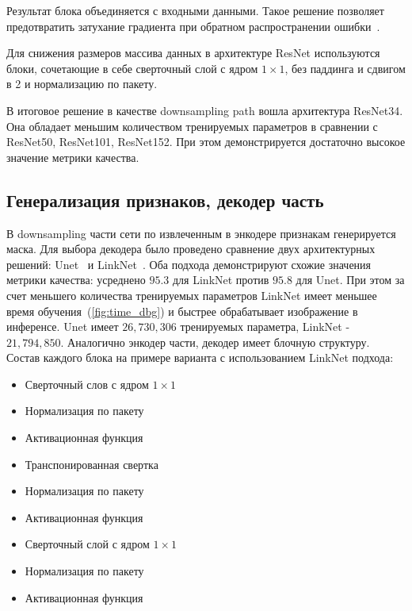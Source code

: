 Результат блока объединяется с входными данными.
Такое решение позволяет предотвратить затухание градиента при обратном распространении ошибки~\autocite{he2015deep}.

Для снижения размеров массива данных в архитектуре ResNet используются блоки, сочетающие в себе сверточный слой
с ядром $1 \times 1$, без паддинга и сдвигом в 2 и нормализацию по пакету.

В итоговое решение в качестве downsampling path вошла архитектура ResNet34.
Она обладает меньшим количеством тренируемых параметров в сравнении с ResNet50, ResNet101, ResNet152.
При этом демонстрируется достаточно высокое значение метрики качества.

\subsection{Генерализация признаков, декодер часть}

В downsampling части сети по извлеченным в энкодере признакам генерируется маска.
Для выбора декодера было проведено сравнение двух архитектурных решений: Unet~\autocite{ronneberger2015unet} и LinkNet~\autocite{chaurasia2017linknet}.
Оба подхода демонстрируют схожие значения метрики качества: усреднено $ 95.3 $ для LinkNet против $ 95.8 $ для Unet.
При этом за счет меньшего количества тренируемых параметров LinkNet имеет меньшее время обучения~(\ref{fig:time_dbg}) и быстрее обрабатывает изображение в инференсе.
Unet имеет $ 26,730,306 $ тренируемых параметра, LinkNet - $ 21,794,850 $.
Аналогично энкодер части, декодер имеет блочную структуру.
Состав каждого блока на примере варианта с использованием LinkNet подхода:

\begin{itemize}
    \item Сверточный слов с ядром $ 1 \times 1 $
    \item Нормализация по пакету
    \item Активационная функция
    \item Транспонированная свертка
    \item Нормализация по пакету
    \item Активационная функция
    \item Сверточный слой с ядром $ 1 \times 1 $
    \item Нормализация по пакету
    \item Активационная функция
\end{itemize}

